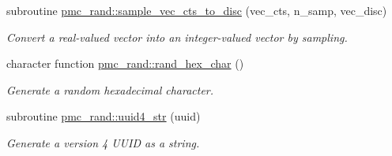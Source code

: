 \begin{DoxyCompactItemize}
subroutine \mbox{\hyperlink{namespacepmc__rand_aae621f54dd9a485ef6dfc472ecc97206}{pmc\+\_\+rand\+::sample\+\_\+vec\+\_\+cts\+\_\+to\+\_\+disc}} (vec\+\_\+cts, n\+\_\+samp, vec\+\_\+disc)
\begin{DoxyCompactList}\small\item\em Convert a real-\/valued vector into an integer-\/valued vector by sampling. \end{DoxyCompactList}\item 
character function \mbox{\hyperlink{namespacepmc__rand_aa7391b756c870846cb14393a37f095df}{pmc\+\_\+rand\+::rand\+\_\+hex\+\_\+char}} ()
\begin{DoxyCompactList}\small\item\em Generate a random hexadecimal character. \end{DoxyCompactList}\item 
subroutine \mbox{\hyperlink{namespacepmc__rand_a2412b4291de3a49c6583e04382762cad}{pmc\+\_\+rand\+::uuid4\+\_\+str}} (uuid)
\begin{DoxyCompactList}\small\item\em Generate a version 4 U\+U\+ID as a string. \end{DoxyCompactList}\end{DoxyCompactItemize}
